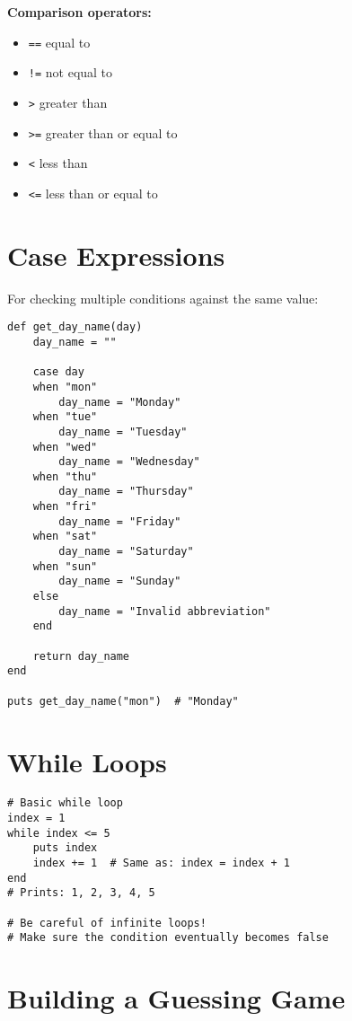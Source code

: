 \documentclass[12pt,a4paper]{article}
\begin{document}
\textbf{Comparison operators:}
\begin{itemize}
    \item \texttt{==} equal to
    \item \texttt{!=} not equal to
    \item \texttt{>} greater than
    \item \texttt{>=} greater than or equal to
    \item \texttt{<} less than
    \item \texttt{<=} less than or equal to
\end{itemize}

\section{Case Expressions}

For checking multiple conditions against the same value:

\begin{lstlisting}
def get_day_name(day)
    day_name = ""
    
    case day
    when "mon"
        day_name = "Monday"
    when "tue"
        day_name = "Tuesday"
    when "wed"
        day_name = "Wednesday"
    when "thu"
        day_name = "Thursday"
    when "fri"
        day_name = "Friday"
    when "sat"
        day_name = "Saturday"
    when "sun"
        day_name = "Sunday"
    else
        day_name = "Invalid abbreviation"
    end
    
    return day_name
end

puts get_day_name("mon")  # "Monday"
\end{lstlisting}

\section{While Loops}

\begin{lstlisting}
# Basic while loop
index = 1
while index <= 5
    puts index
    index += 1  # Same as: index = index + 1
end
# Prints: 1, 2, 3, 4, 5

# Be careful of infinite loops!
# Make sure the condition eventually becomes false
\end{lstlisting}

\section{Building a Guessing Game}
\end{document}
